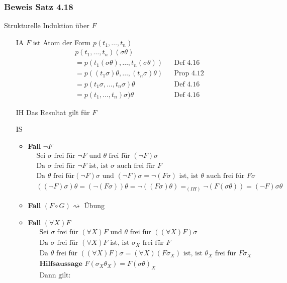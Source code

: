 \subsubsection{Beweis Satz 4.18}
Strukturelle Induktion über \(F\)
\begin{itemize}
	\item[IA] \(F\) ist Atom der Form \(p(t_{1} , \ldots , t_{n})\)
	\begin{align*}
		&p(t_{1} , \ldots , t_{n} )(\sigma\theta)\\&=p(t_{1}(\sigma\theta) , \ldots , t_{n}(\sigma\theta)) &&\text{Def 4.16}\\ &= p((t_{1}\sigma)\theta , \ldots , (t_{n}\sigma)\theta) &&\text{Prop 4.12}\\ &= p(t_{1}\sigma, \ldots , t_{n}\sigma)\theta &&\text{Def 4.16}\\ &= p(t_{1}, \ldots , t_{n})\sigma)\theta &&\text{Def 4.16}
	\end{align*}
	\item[IH] Das Resultat gilt für \(F\)
	\item[IS]
	\begin{itemize}
		\item \textbf{Fall} \(\neg F\)
		\begin{align*}
		&\text{Sei } \sigma \text{ frei für } \neg F \text{ und } \theta \text{ frei für } (\neg F)\sigma \\ &\text{Da } \sigma \text{ frei für } \neg F \text{ ist, ist } \sigma \text{ auch frei für } F \\ &\text{Da } \theta \text{ frei für} (\neg F)\sigma \text{ und } (\neg F)\sigma = \neg (F\sigma) \text{ ist, ist } \theta \text{ auch frei für } F\sigma \\ &((\neg F)\sigma)\theta = (\neg(F\sigma))\theta = \neg ((F\sigma)\theta) =_{(IH)} \neg (F(\sigma\theta)) = (\neg F)\sigma\theta
		\end{align*}
		\item \textbf{Fall} \((F\circ G) \rightsquigarrow \) Übung
		\item \textbf{Fall} \((\forall X)F\)
		\begin{align*}
		&\text{Sei }\sigma \text{ frei für } (\forall X)F \text{ und } \theta \text{ frei für }((\forall X)F)\sigma \\ &\text{Da }\sigma \text{ frei für } (\forall X)F \text{ ist, ist }\sigma_{X} \text{ frei für } F \\&\text{Da }\theta \text{ frei für } ((\forall X)F)\sigma = (\forall X)(F\sigma_{X}) \text{ ist, ist } \theta_{X} \text{ frei für } F\sigma_{X} \\& \textbf{Hilfsaussage } F(\sigma_{X}\theta_{X}) = F(\sigma\theta)_{X} \\&\text{Dann gilt: }

\end{align*}
\end{itemize}
\end{itemize}
